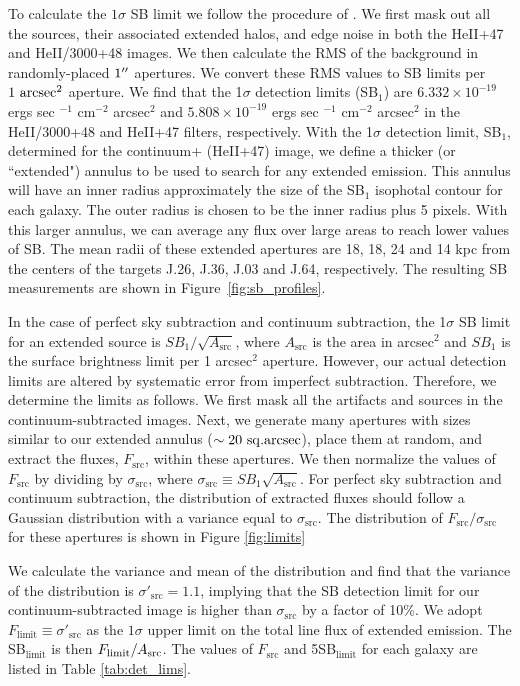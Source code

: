 \documentclass[twocolumn]{aastex62}
\begin{document}
To calculate the $1\sigma$ SB limit we follow the procedure of \cite{Battaia_2015}. We first mask out all the sources, their associated extended halos, and edge noise in both the HeII+47 and HeII/3000+48 images. We then calculate the RMS of the background in randomly-placed $1\mbox{$^{\prime\prime}$}$ apertures. We convert these RMS values to SB limits per $1~\rm arcsec^2$  aperture. We find that the 1$\sigma$ detection limits (SB$_1$) are $6.332\times10^{-19}$ ergs sec $^{-1}$ cm$^{-2}$ arcsec$^2$ and $5.808\times10^{-19} $ ergs sec $^{-1}$ cm$^{-2}$ arcsec$^2$ in the HeII/3000+48 and HeII+47 filters, respectively. 
With the 1$\sigma$ detection limit, SB$_1$, determined for the continuum+ (HeII+47) image, we define a thicker (or ``extended") annulus to be used to search for any extended  emission. This annulus will have an inner radius approximately the size of the SB$_1$ isophotal contour for each galaxy. The outer radius is chosen to be the inner radius plus 5 pixels. With this larger annulus, we can average any flux over large areas to reach lower values of SB. The mean radii of these extended apertures are 18, 18, 24 and 14 kpc from the centers of the targets J.26, J.36, J.03 and J.64, respectively. The resulting SB measurements are shown in Figure~\ref{fig:sb_profiles}.

In the case of perfect sky subtraction and continuum subtraction, the 1$\sigma$ SB limit for an extended source is $SB_{1}/\sqrt{A_\text{src}}$, where $A_\text{src}$ is the area in arcsec$^2$ and $SB_{1}$ is the surface brightness limit per 1 arcsec$^2$ aperture. However, our actual detection limits are altered by systematic error from imperfect subtraction. Therefore, we determine the limits as follows. 
We first mask all the artifacts and sources in the continuum-subtracted images. Next, we generate many apertures with sizes similar to our extended annulus ($\sim 20 \rm\ sq.arcsec$), place them at random, and extract the fluxes, $F_{\text{src}}$, within these apertures. We then normalize the values of $F_{\text{src}}$ by dividing by $\sigma_{\text{src}}$, where $\sigma_{\text{src}} \equiv SB_{1}\sqrt{A_\text{src}}$. For perfect sky subtraction and continuum subtraction, the distribution of extracted fluxes should follow a Gaussian distribution with a variance equal to $\sigma_{\text{src}}$. The distribution of $F_{\text{src}}/\sigma_{\text{src}}$ for these apertures is shown in Figure \ref{fig:limits}

We calculate the variance and mean of the distribution and find that the variance of the distribution is $\sigma'_{\text{src}}=1.1$, implying that the SB detection limit for our continuum-subtracted image is higher than $\sigma_{\text{src}}$ by a factor of 10\%. We adopt $F_{\text{limit}} \equiv \sigma'_{\text{src}}$  as the $1 \sigma$ upper limit on the total line flux of extended  emission. The SB$_{\text{limit}}$ is then $F_{\text{limit}}/A_{\rm{src}}$. The values of $F_{\text{src}}$ and 5SB$_{\text{limit}}$ for each galaxy are listed in Table \ref{tab:det_lims}.
\end{document}
